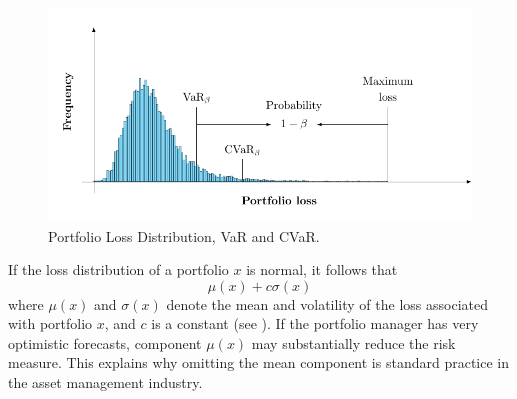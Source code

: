 \begin{figure}[H]
	\centering
	\includegraphics{figures/VarCvar.pdf}
	\caption{Portfolio Loss Distribution, VaR and CVaR.}
	\label{fig:VarCvar}
\end{figure}

\begin{remark}\normalfont\label{re:Normal}
If the loss distribution of a portfolio $x$ is normal, it follows that
\[
	\mu(x)+c\sigma(x)
\]
where $\mu(x)$ and $\sigma(x)$ denote the mean and volatility of the loss associated with portfolio $x$, and $c$ is a constant (see \cite[Chapter 2]{Roncalli2014}). If the portfolio manager has very optimistic forecasts, component $\mu(x)$ may substantially reduce the risk measure. This explains why omitting the mean component is standard practice in the asset management industry.
\end{remark}

